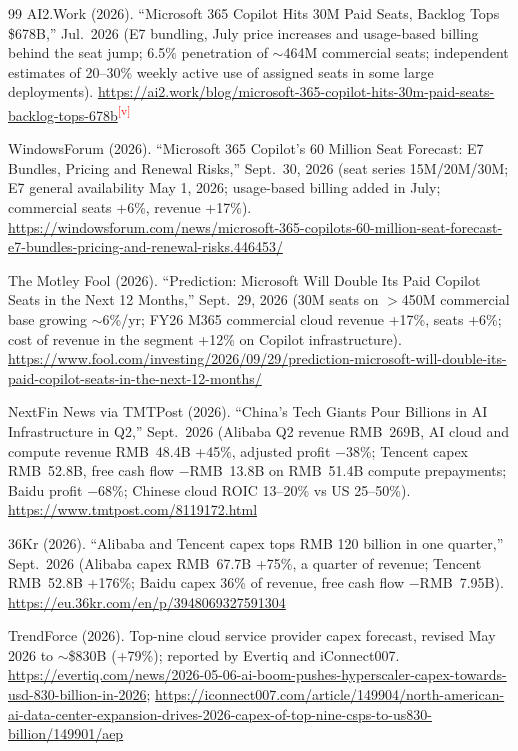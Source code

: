 \documentclass[11pt,letterpaper]{article}
\newcommand{\verify}{\textsuperscript{\textcolor{red}{[v]}}}
\begin{document}
\begin{thebibliography}{99}
AI2.Work (2026). ``Microsoft 365 Copilot Hits 30M Paid Seats, Backlog Tops \$678B,'' Jul.~2026 (E7 bundling, July price increases and usage-based billing behind the seat jump; 6.5\% penetration of $\sim$464M commercial seats; independent estimates of 20--30\% weekly active use of assigned seats in some large deployments). \url{https://ai2.work/blog/microsoft-365-copilot-hits-30m-paid-seats-backlog-tops-678b}\verify

WindowsForum (2026). ``Microsoft 365 Copilot's 60 Million Seat Forecast: E7 Bundles, Pricing and Renewal Risks,'' Sept.~30, 2026 (seat series 15M/20M/30M; E7 general availability May 1, 2026; usage-based billing added in July; commercial seats +6\%, revenue +17\%). \url{https://windowsforum.com/news/microsoft-365-copilots-60-million-seat-forecast-e7-bundles-pricing-and-renewal-risks.446453/}

The Motley Fool (2026). ``Prediction: Microsoft Will Double Its Paid Copilot Seats in the Next 12 Months,'' Sept.~29, 2026 (30M seats on $>$450M commercial base growing $\sim$6\%/yr; FY26 M365 commercial cloud revenue +17\%, seats +6\%; cost of revenue in the segment +12\% on Copilot infrastructure). \url{https://www.fool.com/investing/2026/09/29/prediction-microsoft-will-double-its-paid-copilot-seats-in-the-next-12-months/}

NextFin News via TMTPost (2026). ``China's Tech Giants Pour Billions in AI Infrastructure in Q2,'' Sept.~2026 (Alibaba Q2 revenue RMB~269B, AI cloud and compute revenue RMB~48.4B +45\%, adjusted profit $-$38\%; Tencent capex RMB~52.8B, free cash flow $-$RMB~13.8B on RMB~51.4B compute prepayments; Baidu profit $-$68\%; Chinese cloud ROIC 13--20\% vs US 25--50\%). \url{https://www.tmtpost.com/8119172.html}

36Kr (2026). ``Alibaba and Tencent capex tops RMB 120 billion in one quarter,'' Sept.~2026 (Alibaba capex RMB~67.7B +75\%, a quarter of revenue; Tencent RMB~52.8B +176\%; Baidu capex 36\% of revenue, free cash flow $-$RMB~7.95B). \url{https://eu.36kr.com/en/p/3948069327591304}

TrendForce (2026). Top-nine cloud service provider capex forecast, revised May 2026 to $\sim$\$830B (+79\%); reported by Evertiq and iConnect007. \url{https://evertiq.com/news/2026-05-06-ai-boom-pushes-hyperscaler-capex-towards-usd-830-billion-in-2026}; \url{https://iconnect007.com/article/149904/north-american-ai-data-center-expansion-drives-2026-capex-of-top-nine-csps-to-us830-billion/149901/aep}


\end{thebibliography}
\end{document}
